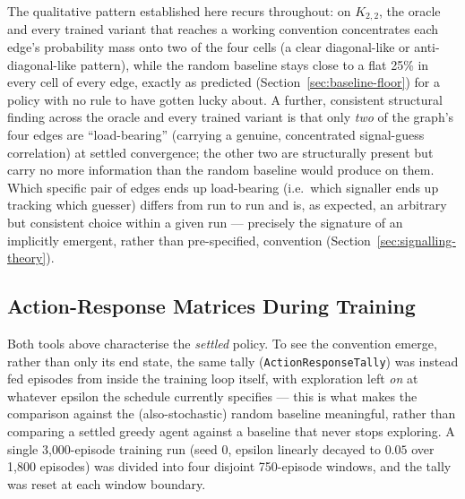 \documentclass[a4paper,twoside,12pt]{report}
\begin{document}
The qualitative pattern established here recurs throughout: on $K_{2,2}$, the
oracle and every trained variant that reaches a working convention
concentrates each edge's probability mass onto two of the four cells (a clear
diagonal-like or anti-diagonal-like pattern), while the random baseline
stays close to a flat 25\% in every cell of every edge, exactly as predicted
(Section~\ref{sec:baseline-floor}) for a policy with no rule to have gotten
lucky about. A further, consistent structural finding across the oracle and
every trained variant is that only \emph{two} of the graph's four edges are
``load-bearing'' (carrying a genuine, concentrated signal-guess correlation)
at settled convergence; the other two are structurally present but carry no
more information than the random baseline would produce on them. Which
specific pair of edges ends up load-bearing (i.e.\ which signaller ends up
tracking which guesser) differs from run to run and is, as expected, an
arbitrary but consistent choice within a given run --- precisely the
signature of an implicitly emergent, rather than pre-specified, convention
(Section~\ref{sec:signalling-theory}).

\subsection{Action-Response Matrices During Training}
\label{sec:results-arm-training}

Both tools above characterise the \emph{settled} policy. To see the
convention emerge, rather than only its end state, the same tally
(\texttt{ActionResponseTally}) was instead fed episodes from inside the
training loop itself, with exploration left \emph{on} at whatever epsilon the
schedule currently specifies --- this is what makes the comparison against
the (also-stochastic) random baseline meaningful, rather than comparing a
settled greedy agent against a baseline that never stops exploring. A single
3{,}000-episode training run (seed 0, epsilon linearly decayed to $0.05$ over
1{,}800 episodes) was divided into four disjoint 750-episode windows, and the
tally was reset at each window boundary.
\end{document}
